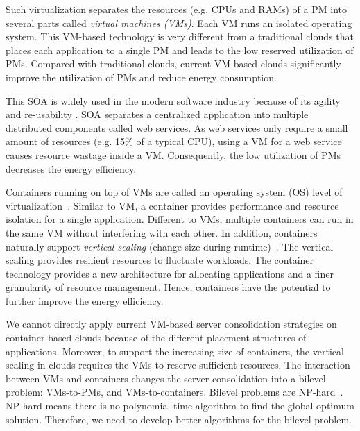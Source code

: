 Such virtualization separates the resources (e.g. CPUs and RAMs) of a PM into several parts called \emph{virtual machines (VMs)}. 
Each VM runs an isolated operating system. This VM-based technology is very different from a 
traditional clouds that places each application to a single PM and leads to the low reserved utilization of PMs. 
Compared with traditional clouds, current VM-based clouds significantly improve the utilization of PMs and reduce energy consumption.


 This SOA is widely used in the modern software industry because of its agility and re-usability \cite{Sprott:2004wt}.
SOA separates a centralized application into multiple distributed components called web services. 
As web services only require a small amount of resources (e.g. 15\% of a typical CPU), 
using a VM for a web service causes resource wastage inside a VM. Consequently, the low utilization of PMs decreases
the energy efficiency.


 Containers running on top of 
VMs are called an operating system (OS) level of virtualization~\cite{Soltesz:2007cu}. Similar to VM, 
a container provides performance and resource isolation for a single application. 
Different to VMs, multiple containers can run in the same VM without interfering with each other. 
In addition, containers naturally support \emph{vertical scaling} (change size during runtime)~\cite{Vaquero:2011gb}. 
The vertical scaling provides resilient resources to fluctuate workloads. The container technology provides a new 
architecture for allocating applications and a finer granularity of resource management. Hence, containers have the potential to further
improve the energy efficiency.



We cannot directly apply current VM-based server consolidation strategies on container-based clouds because 
of the different placement structures of applications. Moreover, to support the increasing size of containers, 
the vertical scaling in clouds requires the VMs to reserve sufficient resources. The interaction between VMs and containers changes 
the server consolidation into a bilevel problem: VMs-to-PMs, and VMs-to-containers. Bilevel problems are NP-hard~\cite{Sinha:2013tn}.  NP-hard means there is no polynomial time algorithm to find the global optimum solution. Therefore, we need to develop better algorithms for the bilevel problem.


